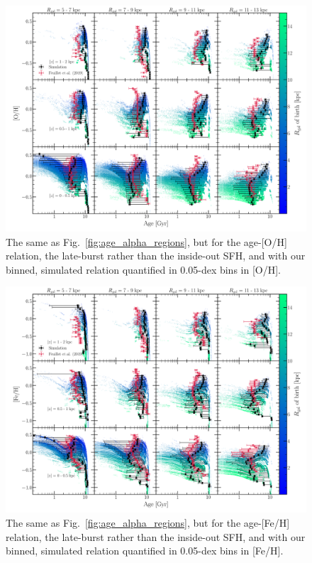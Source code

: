 \documentclass[a4paper, fleqn, usenatbib, useAMS]{mnras}
\begin{document}
\begin{figure} 
\centering 
\includegraphics[scale = 0.32]{amr_lateburst_O.pdf} 
\caption{The same as Fig.~\ref{fig:age_alpha_regions}, but for the age-[O/H] 
relation, the late-burst rather than the inside-out SFH, and with our binned, 
simulated relation quantified in 0.05-dex bins in [O/H]. }
\label{fig:age_oh_regions} 
\end{figure} 

\begin{figure} 
\centering 
\includegraphics[scale = 0.32]{amr_lateburst_Fe.pdf} 
\caption{The same as Fig.~\ref{fig:age_alpha_regions}, but for the age-[Fe/H] 
relation, the late-burst rather than the inside-out SFH, and with our binned, 
simulated relation quantified in 0.05-dex bins in [Fe/H]. } 
\label{fig:age_feh_regions} 
\end{figure} 
\end{document}
